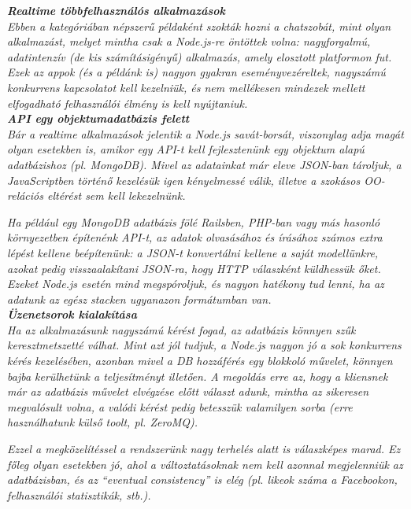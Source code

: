 \noindent\textit{\textbf{Realtime többfelhasználós alkalmazások}}\\

\textit{Ebben a kategóriában népszerű példaként szokták hozni a chatszobát, mint olyan alkalmazást, melyet mintha csak a Node.js-re öntöttek volna: nagyforgalmú, adatintenzív (de kis számításigényű) alkalmazás, amely elosztott platformon fut. Ezek az appok (és a példánk is) nagyon gyakran eseményvezéreltek, nagyszámú konkurrens kapcsolatot kell kezelniük, és nem mellékesen mindezek mellett elfogadható felhasználói élmény is kell nyújtaniuk.}\\

\noindent\textit{\textbf{API egy objektumadatbázis felett}}\\

\textit{Bár a realtime alkalmazások jelentik a Node.js savát-borsát, viszonylag adja magát olyan esetekben is, amikor egy API-t kell fejlesztenünk egy objektum alapú adatbázishoz (pl. MongoDB). Mivel az adatainkat már eleve JSON-ban tároljuk, a JavaScriptben történő kezelésük igen kényelmessé válik, illetve a szokásos OO-relációs eltérést sem kell lekezelnünk.}

\textit{Ha például egy MongoDB adatbázis fölé Railsben, PHP-ban vagy más hasonló környezetben építenénk API-t, az adatok olvasásához és írásához számos extra lépést kellene beépítenünk: a JSON-t konvertálni kellene a saját modellünkre, azokat pedig visszaalakítani JSON-ra, hogy HTTP válaszként küldhessük őket. Ezeket Node.js esetén mind megspóroljuk, és nagyon hatékony tud lenni, ha az adatunk az egész stacken ugyanazon formátumban van.}\\

\noindent\textit{\textbf{Üzenetsorok kialakítása}}\\

\textit{Ha az alkalmazásunk nagyszámú kérést fogad, az adatbázis könnyen szűk keresztmetszetté válhat. Mint azt jól tudjuk, a Node.js nagyon jó a sok konkurrens kérés kezelésében, azonban mivel a DB hozzáférés egy blokkoló művelet, könnyen bajba kerülhetünk a teljesítményt illetően. A megoldás erre az, hogy a kliensnek már az adatbázis művelet elvégzése előtt választ adunk, mintha az sikeresen megvalósult volna, a valódi kérést pedig betesszük valamilyen sorba (erre használhatunk külső toolt, pl. ZeroMQ).}

\textit{Ezzel a megközelítéssel a rendszerünk nagy terhelés alatt is válaszképes marad. Ez főleg olyan esetekben jó, ahol a változtatásoknak nem kell azonnal megjelenniük az adatbázisban, és az “eventual consistency” is elég (pl. likeok száma a Facebookon, felhasználói statisztikák, stb.).}

